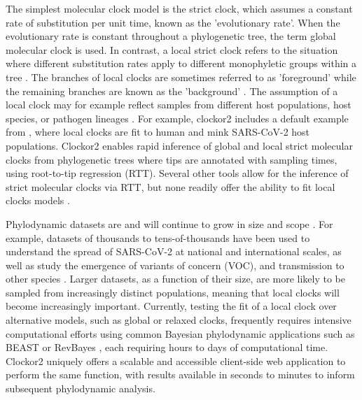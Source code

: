 \documentclass{article}
\begin{document}
The simplest molecular clock model is the strict clock, which assumes a constant rate of substitution per unit time, known as the 'evolutionary rate'. When the evolutionary rate is constant throughout a phylogenetic tree, the term global molecular clock is used. In contrast, a local strict clock refers to the situation where different substitution rates apply to different monophyletic groups within a tree \citep{ho2014molecular}. The branches of local clocks are sometimes referred to as 'foreground' while the remaining branches are known as the 'background' \citep{yoder2000estimation}. The assumption of a local clock may for example reflect samples from different host populations, host species, or pathogen lineages \citep{worobey_synchronized_2014}. For example, clockor2 includes a default example from \citet{porter2023evolutionary}, where local clocks are fit to human and mink SARS-CoV-2 host populations. Clockor2 enables rapid inference of global and local strict molecular clocks from phylogenetic trees where tips are annotated with sampling times, using root-to-tip regression (RTT). Several other tools allow for the inference of strict molecular clocks via RTT, but none readily offer the ability to fit local clocks models \citep{rambaut_exploring_2016, hadfield_nextstrain_2018,sagulenko_treetime_2018,volz_scalable_2017}. 

Phylodynamic datasets are and will continue to grow in size and scope \cite{featherstone2022epidemiological}. For example, datasets of thousands to tens-of-thousands have been used to understand the spread of SARS-CoV-2 at national and international scales, as well as study the emergence of variants of concern (VOC), and transmission to other species \citep{du_plessis_establishment_2021,hill_origins_2022,nadeau_swiss_2023,porter2023evolutionary}. Larger datasets, as a function of their size, are more likely to be sampled from increasingly distinct populations, meaning that local clocks will become increasingly important. Currently, testing the fit of a local clock over alternative models, such as global or relaxed clocks, frequently requires intensive computational efforts using common Bayesian phylodynamic applications such as BEAST or RevBayes \citep{bouckaert_beast_2019, suchard_bayesian_2018, hoehna_2016_revbayes}, each requiring hours to days of computational time. Clockor2 uniquely offers a scalable and accessible client-side web application to perform the same function, with results available in seconds to minutes to inform subsequent phylodynamic analysis.
\end{document}
